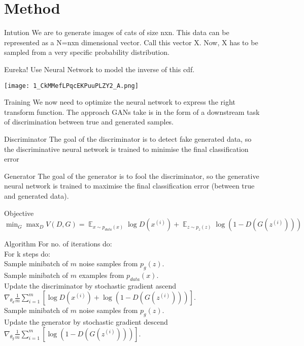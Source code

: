 \documentclass{beamer}
\DeclareMathOperator{\EX}{\mathbb{E}}%
\begin{document}
\section{Method}
\begin{frame}{Intution}
We are to generate images of cats of size nxn. This data can be represented as a N=nxn dimensional vector. Call this vector X. Now, X has to be sampled from a very specific probability distribution. 
\begin{block}{Eureka!}
    Use Neural Network to model the inverse of this cdf.
\end{block}
\texttt{[image: 1\_CkMMefLPqcEKPuuPLZY2\_A.png]}
\end{frame}
\begin{frame}{Training}
    We now need to optimize the neural network to express the right transform function. 
    The approach GANs take is in the form of a downstream task of discrimination between true and generated samples.
    \begin{block}{Discriminator}
        The goal of the discriminator is to detect fake generated data, so the discriminative neural network is trained to minimise the final classification error
    \end{block}
    \begin{block}{Generator}
        The goal of the generator is to fool the discriminator, so the generative neural network is trained to maximise the final classification error (between true and generated data).
    \end{block}
    \begin{alertblock}{Objective}
        $
        \min_G \max_D V(D,G) = \EX_{x \sim p_{data}(x)} \log D(x^{(i)}) +  \EX_{z \sim p_{z}(z)} \log (1-D(G(z^{(i)})))
        $
    \end{alertblock}
\end{frame}
\begin{frame}{Algorithm}
For no. of iterations do:\\
\hspace{1cm}For k steps do:\\
\hspace{2cm}Sample minibatch of \(m\) noise samples from \(p_g(z)\).\\
\hspace{2cm}Sample minibatch of \(m\) examples from \(p_{data}(x)\).\\
\hspace{2cm}Update the discriminator by stochastic gradient ascend\\
\hspace{3cm}$
\nabla_{\theta_d}\frac{1}{m}\sum_{i=1}^{m}[ \log D(x^{(i)}) + \log (1-D(G(z^{(i)}))) ].
$\\
\hspace{1cm}Sample minibatch of \(m\) noise samples from \(p_g(z)\).\\
\hspace{1cm}Update the generator by stochastic gradient descend\\
\hspace{3cm}$\nabla_{\theta_g}\frac{1}{m}\sum_{i=1}^{m}[ \log (1-D(G(z^{(i)}))) ].$\\
\hspace{1cm}
\end{frame}
\end{document}
